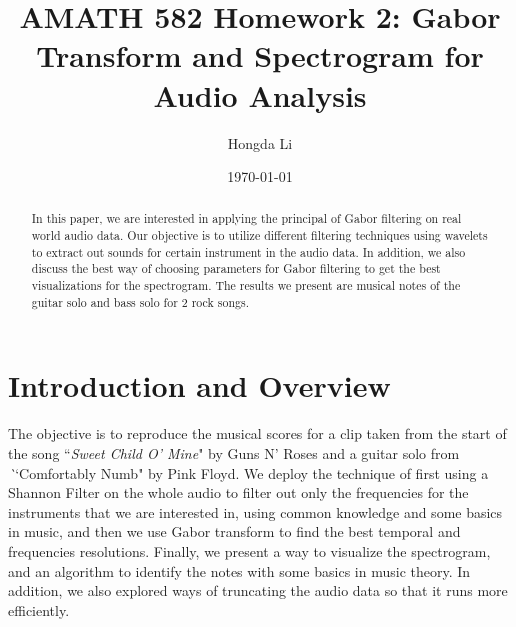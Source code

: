 \documentclass{article}
\title{AMATH 582 Homework 2: Gabor Transform and Spectrogram for Audio Analysis}
\author{Hongda Li}
\date{\today}
\begin{document}
\maketitle

\begin{abstract}
   In this paper, we are interested in applying the principal of Gabor filtering on real world audio data. Our objective is to utilize different filtering techniques using wavelets to extract out sounds for certain instrument in the audio data. In addition, we also discuss the best way of choosing parameters for Gabor filtering to get the best visualizations for the spectrogram. The results we present are musical notes of the guitar solo and bass solo for 2 rock songs. 
\end{abstract}


\section{Introduction and Overview}
    
    \par\hspace{1.1em}
    The objective is to reproduce the musical scores for a clip taken from the start of the song ``\textit{Sweet Child O' Mine}"  by Guns N' Roses and a guitar solo from \textit``{Comfortably Numb}" by Pink Floyd. We deploy the technique of first using a Shannon Filter on the whole audio to filter out only the frequencies for the instruments that we are interested in, using common knowledge and some basics in music, and then we use Gabor transform to find the best temporal and frequencies resolutions. Finally, we present a way to visualize the spectrogram, and an algorithm to identify the notes with some basics in music theory. In addition, we also explored ways of truncating the audio data so that it runs more efficiently.
\end{document}

